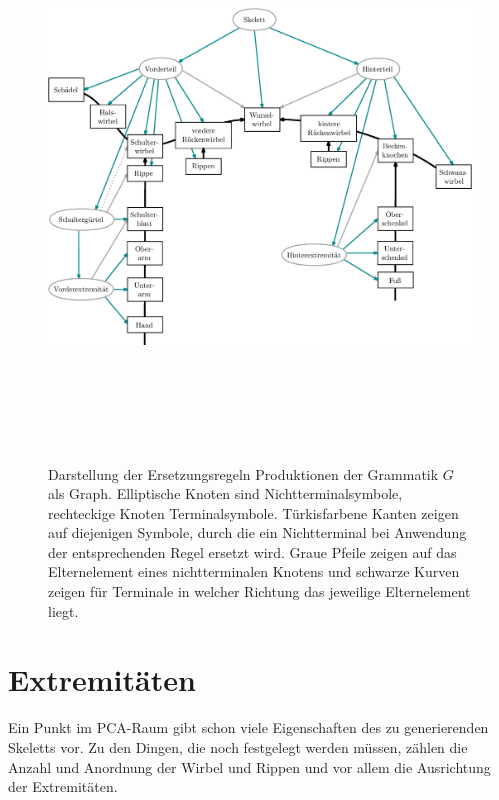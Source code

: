  
 \begin{figure}
  \centering
  \includegraphics[height=15cm, angle=90, origin=c]{graphics/grammarGraph}
  \caption{Darstellung der Ersetzungsregeln \bzw Produktionen der Grammatik $G$ als Graph. Elliptische Knoten sind Nichtterminalsymbole, rechteckige Knoten Terminalsymbole. Türkisfarbene Kanten zeigen auf diejenigen Symbole, durch die ein Nichtterminal bei Anwendung der entsprechenden Regel ersetzt wird. Graue Pfeile zeigen auf das Elternelement eines nichtterminalen Knotens und schwarze Kurven zeigen für Terminale in welcher Richtung das jeweilige Elternelement liegt.}
  \label{grammar_graph}
 \end{figure}

\section{Extremitäten}
\label{section:extremity_generation}

Ein Punkt im PCA-Raum gibt schon viele Eigenschaften des zu generierenden Skeletts vor. Zu den Dingen, die noch festgelegt werden müssen, zählen \zb die Anzahl und Anordnung der Wirbel und Rippen und vor allem die Ausrichtung der Extremitäten. 

